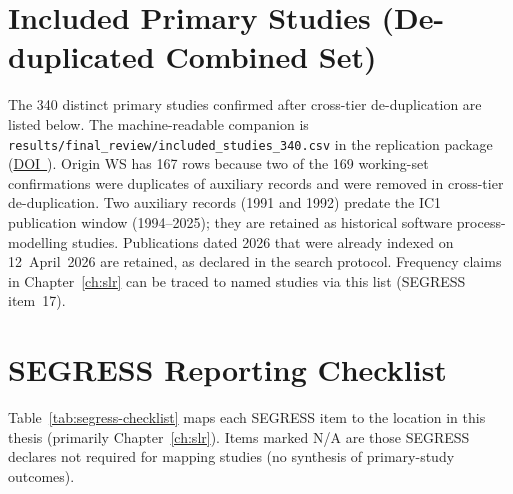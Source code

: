 \chapter{Included Primary Studies (De-duplicated Combined Set)}
\label{app:included}

The 340 distinct primary studies confirmed after cross-tier de-duplication
are listed below. The machine-readable companion is
\texttt{results/final\_review/included\_studies\_340.csv} in the replication
package (\href{\zenododoiurl}{DOI~\zenododoi}). Origin WS has 167 rows because
two of the 169 working-set confirmations were duplicates of auxiliary records
and were removed in cross-tier de-duplication. Two auxiliary records (1991 and
1992) predate the IC1 publication window (1994--2025); they are retained as
historical software process-modelling studies. Publications dated 2026 that
were already indexed on 12~April~2026 are retained, as declared in the search
protocol. Frequency claims in Chapter~\ref{ch:slr} can be traced to named
studies via this list (SEGRESS item~17).



\chapter{SEGRESS Reporting Checklist}
\label{app:segress}

Table~\ref{tab:segress-checklist} maps each SEGRESS item
\cite{kitchenham2023segress} to the location in this thesis (primarily
Chapter~\ref{ch:slr}). Items marked N/A are those SEGRESS declares not required
for mapping studies (no synthesis of primary-study outcomes).



